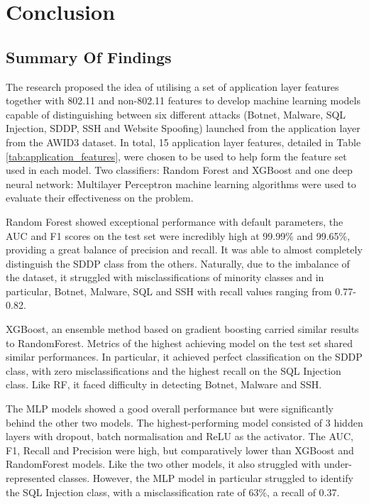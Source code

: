 
\section{Conclusion}
\label{sec: Conclusion}


\subsection{Summary Of Findings}

The research proposed the idea of utilising a set of application layer features together with 802.11 and non-802.11 features to develop machine learning models capable of distinguishing between six different attacks (Botnet, Malware, SQL Injection, SDDP, SSH and Website Spoofing) launched from the application layer from the AWID3 dataset. In total, 15 application layer features, detailed in Table \ref{tab:application_features}, were chosen to be used to help form the feature set used in each model. Two classifiers: Random Forest and XGBoost and one deep neural network: Multilayer Perceptron machine learning algorithms were used to evaluate their effectiveness on the problem. 

\medskip
Random Forest showed exceptional performance with default parameters, the AUC and F1 scores on the test set were incredibly high at 99.99\% and 99.65\%, providing a great balance of precision and recall. It was able to almost completely distinguish the SDDP class from the others. Naturally, due to the imbalance of the dataset, it struggled with misclassifications of minority classes and in particular, Botnet, Malware, SQL and SSH with recall values ranging from 0.77-0.82. 

\smallskip
XGBoost, an ensemble method based on gradient boosting carried similar results to RandomForest. Metrics of the highest achieving model on the test set shared similar performances. In particular, it achieved perfect classification on the SDDP class, with zero misclassifications and the highest recall on the SQL Injection class. Like RF, it faced difficulty in detecting Botnet, Malware and SSH.

\smallskip
The MLP models showed a good overall performance but were significantly behind the other two models. The highest-performing model consisted of 3 hidden layers with dropout, batch normalisation and ReLU as the activator. The AUC, F1, Recall and Precision were high, but comparatively lower than XGBoost and RandomForest models. Like the two other models, it also struggled with under-represented classes. However, the MLP model in particular struggled to identify the SQL Injection class, with a misclassification rate of 63\%, a recall of 0.37. 

